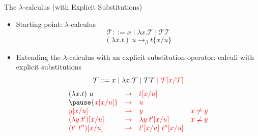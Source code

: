 \documentclass[10pt]{beamer}
\newcommand{\term}{{\mathcal{T}}}
\begin{document}
\begin{frame}[fragile]{The $\lambda$-calculus (with Explicit Substitutions)}
   \begin{itemize}
  \item Starting point: $\lambda$-calculus
    $$\term ::= x \mid \lambda x.\term \mid \term\term $$
    $$(\lambda x.t)\ u \to_\beta t\{x/u\}$$
    \pause
    \item Extending the $\lambda$-calculus with an explicit substitution operator: {\color{red} calculi with explicit substitutions} 
    $$\term ::= x \mid \lambda x.\term \mid \term\term\; {\color{red} \mid \term[x/\term]}$$ \pause
    $$\begin{array}{llll}
        (\lambda x.t)\ u &  \to &  {\color{red} t[x/u]} & \\ \pause
        {\color{red} x[x/u]} & {\color{red}\to} & {\color{red}u} & \\
        {\color{red} y[x/u]} & {\color{red}\to} & {\color{red}y} & {\color{red} x\neq y} \\
        {\color{red}(\lambda y.t')[x/u]} &  {\color{red} \to} &  {\color{red} \lambda y. t'[x/u]} & {\color{red} x\neq y} \\
        {\color{red} (t'\ t'')[x/u]} & {\color{red}\to} & {\color{red} t'[x/u]\ t''[x/u]} & \\
      \end{array}$$
  \end{itemize}
\end{frame}
\end{document}
